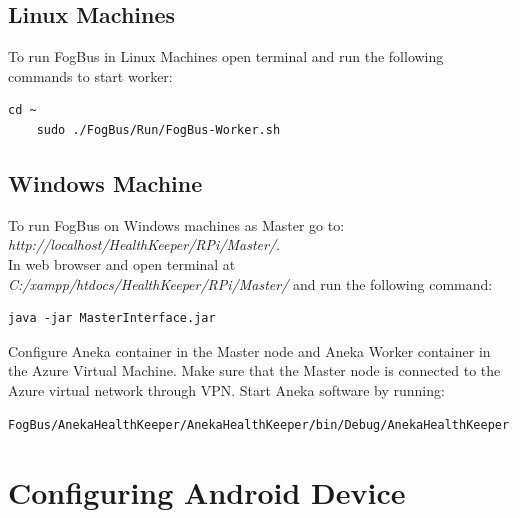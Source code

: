 \documentclass{article}
\begin{document}
\subsection{Linux Machines}

To run FogBus in Linux Machines open terminal and run the following commands to start worker:

\begin{lstlisting}[style=BashInputStyle]
    cd ~
    sudo ./FogBus/Run/FogBus-Worker.sh
\end{lstlisting}

\subsection{Windows Machine}

To run FogBus on Windows machines as Master go to: \\ \textit{http://localhost/HealthKeeper/RPi/Master/}.\\
In web browser and open terminal at \textit{C:/xampp/htdocs/HealthKeeper/RPi/Master/} and run the following command:
\begin{lstlisting}[style=BashInputStyle]
    java -jar MasterInterface.jar
\end{lstlisting}

Configure Aneka container in the Master node and Aneka Worker container in the Azure Virtual Machine. Make sure that the Master node is connected to the Azure virtual network through VPN. Start Aneka software by running:
\begin{lstlisting}[style=BashInputStyle]
    FogBus/AnekaHealthKeeper/AnekaHealthKeeper/bin/Debug/AnekaHealthKeeper.exe
\end{lstlisting}


\newpage

\section{Configuring Android Device}
\end{document}
